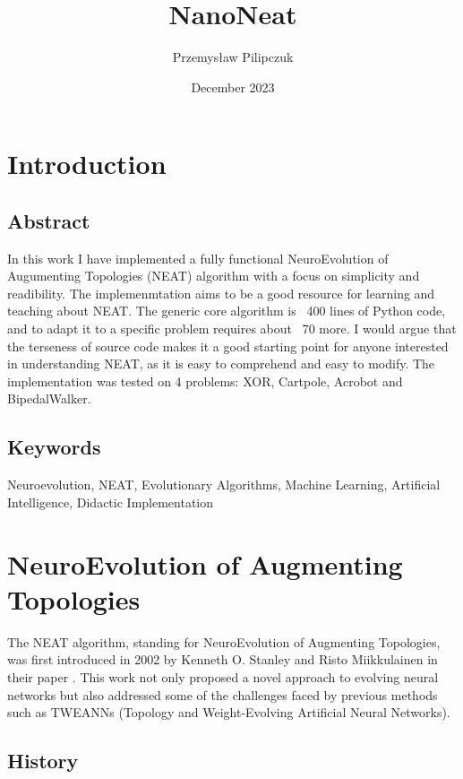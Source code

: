 \documentclass{article}
\title{NanoNeat}
\author{Przemysław Pilipczuk}
\date{December 2023}
\begin{document}
\maketitle

\tableofcontents
\section{Introduction}
\subsection{Abstract}
In this work I have implemented a fully functional  NeuroEvolution of Augumenting Topologies (NEAT) algorithm 
with a focus on simplicity and readibility. The implemenmtation aims to be a good resource for learning and teaching about NEAT.
The generic core algorithm is ~400 lines of Python code, and to adapt it to a specific problem requires about ~70 
more. I would argue that the terseness of source code makes it a good starting point for anyone interested in understanding NEAT, 
as it is easy to comprehend and easy to modify.
The implementation was tested on 4 problems: XOR, Cartpole, Acrobot and BipedalWalker. 

\subsection{Keywords}
Neuroevolution, NEAT, Evolutionary Algorithms, Machine Learning, Artificial Intelligence, Didactic Implementation
\section {NeuroEvolution of Augmenting Topologies}
The NEAT algorithm, standing for NeuroEvolution of Augmenting Topologies, was first introduced in 2002 by Kenneth O. Stanley
and Risto Miikkulainen in their paper \cite{originalNeat}. This work not only proposed a novel approach to evolving neural
networks but also addressed some of the challenges faced by previous methods such as TWEANNs (Topology and Weight-Evolving
Artificial Neural Networks).
\subsection{History}
\end{document}

